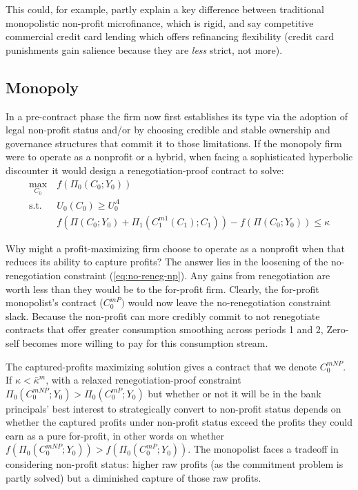 \documentclass[11pt,english]{article}
\theoremstyle{plain}
\theoremstyle{definition}
\begin{document}
This could, for example, partly explain a key difference between traditional
monopolistic non-profit microfinance, which is rigid, and say competitive
commercial credit card lending which offers refinancing flexibility
(credit card punishments gain salience because they are\textit{ less}
strict, not more).

\subsection{Monopoly}

In a pre-contract phase the firm now first establishes its type via
the adoption of legal non-profit status and/or by choosing credible
and stable ownership and governance structures that commit it to those
limitations. If the monopoly firm were to operate as a nonprofit or
a hybrid, when facing a sophisticated hyperbolic discounter it would
design a renegotiation-proof contract to solve: 
\begin{align}
\underset{C_{0}}{\text{max}} & \ f\left(\Pi_{0}\left(C_{0};Y_{0}\right)\right)\\
\text{s.t.} & \ U_{0}\left(C_{0}\right)\geq U_{0}^{A}\\
 & \ f\left(\Pi\left(C_{0};Y_{0}\right)+\Pi_{1}\left(C_{1}^{m1}\left(C_{1}\right);C_{1}\right)\right)-f\left(\Pi\left(C_{0};Y_{0}\right)\right)\leq\kappa\label{eq:no-reneg-np}
\end{align}

Why might a profit-maximizing firm choose to operate as a nonprofit
when that reduces its ability to capture profits? The answer lies
in the loosening of the no-renegotiation constraint (\ref{eq:no-reneg-np}).
Any gains from renegotiation are worth less than they would be to
the for-profit firm. Clearly, the for-profit monopolist's contract
($C_{0}^{mP})$ would now leave the no-renegotiation constraint slack.
Because the non-profit can more credibly commit to not renegotiate
contracts that offer greater consumption smoothing across periods
1 and 2, Zero-self becomes more willing to pay for this consumption
stream.

The captured-profits maximizing solution gives a contract that we
denote $C_{0}^{mNP}$. If $\kappa<\bar{\kappa}^{m}$, with a relaxed
renegotiation-proof constraint $\Pi_{0}(C_{0}^{mNP};Y_{0})>\Pi_{0}(C_{0}^{mP};Y_{0})$
but whether or not it will be in the bank principals' best interest
to strategically convert to non-profit status depends on whether the
captured profits under non-profit status exceed the profits they could
earn as a pure for-profit, in other words on whether $f\left(\Pi_{0}(C_{0}^{mNP};Y_{0})\right)>f\left(\Pi_{0}(C_{0}^{mP};Y_{0})\right)$.
The monopolist faces a tradeoff in considering non-profit status:
higher raw profits (as the commitment problem is partly solved) but
a diminished capture of those raw profits.
\end{document}
